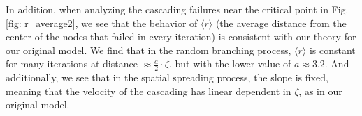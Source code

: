 \documentclass[twocolumn,noshowpacs,pre,preprintnumbers,superscriptaddress,amsmath,amssymb,floatfix]{revtex4}
\begin{document}
	In addition, when analyzing the cascading failures near the critical point in Fig. \ref{fig: r_average2}, we see that the behavior of $\langle r \rangle$ (the average distance from the center of the nodes that failed in every iteration) is consistent with our theory for our original model.
	We find that in the random branching process, $\langle r \rangle$ is constant for many iterations at distance $ \approx \frac{a}{2}\cdot\zeta$, but with the lower value of $a \approx 3.2$.
	And additionally, we see that in the spatial spreading process, the slope is fixed, meaning that the velocity of the cascading has linear dependent in $\zeta$, as in our original model.
	
\end{document}
